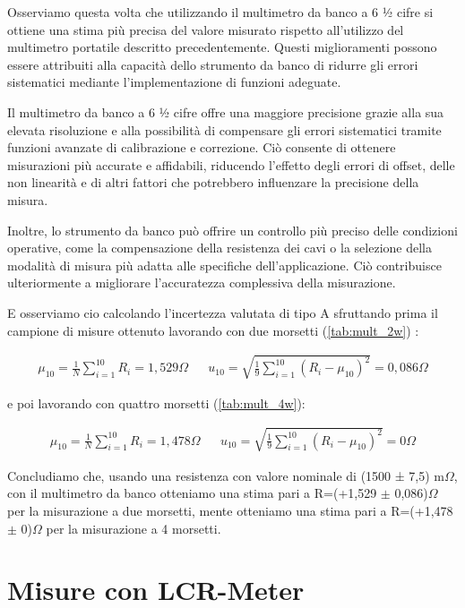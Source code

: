 Osserviamo questa volta che utilizzando il multimetro da banco a 6 ½ cifre si ottiene una stima più precisa del valore misurato rispetto all'utilizzo del multimetro portatile descritto precedentemente. Questi miglioramenti possono essere attribuiti alla capacità dello strumento da banco di ridurre gli errori sistematici mediante l'implementazione di funzioni adeguate.

Il multimetro da banco a 6 ½ cifre offre una maggiore precisione grazie alla sua elevata risoluzione e alla possibilità di compensare gli errori sistematici tramite funzioni avanzate di calibrazione e correzione. Ciò consente di ottenere misurazioni più accurate e affidabili, riducendo l'effetto degli errori di offset, delle non linearità e di altri fattori che potrebbero influenzare la precisione della misura.

Inoltre, lo strumento da banco può offrire un controllo più preciso delle condizioni operative, come la compensazione della resistenza dei cavi o la selezione della modalità di misura più adatta alle specifiche dell'applicazione. Ciò contribuisce ulteriormente a migliorare l'accuratezza complessiva della misurazione.

E osserviamo cio calcolando l'incertezza valutata di tipo A sfruttando prima il campione di misure ottenuto lavorando con due morsetti (\ref{tab:mult_2w}) :

\begin{align*}
    \mu_{10}=\frac{1}{N}\sum_{i=1}^{10}R_{i}=1,529\Omega  &&  u_{10}=\sqrt{\frac{1}{9}\sum_{i=1}^{10}(R_i-\mu_{10})^{2}}=0,086\Omega 
\end{align*}
\FloatBarrier

e poi lavorando con quattro morsetti (\ref{tab:mult_4w}):

\begin{align*}
    \mu_{10}=\frac{1}{N}\sum_{i=1}^{10}R_{i}=1,478\Omega && u_{10}=\sqrt{\frac{1}{9}\sum_{i=1}^{10}(R_i-\mu_{10})^{2}}=0\Omega 
\end{align*}
\FloatBarrier

Concludiamo che, usando una resistenza con valore nominale di (1500 ± 7,5) m$\Omega$, con il multimetro da banco otteniamo una stima pari a R=(+1,529 $\pm$ 0,086)$\Omega$ per la misurazione a due morsetti, mente otteniamo una stima pari a R=(+1,478 $\pm$ 0)$\Omega$ per la misurazione a 4 morsetti.
\clearpage

\section{Misure con LCR-Meter}
\label{sec:lcr}

